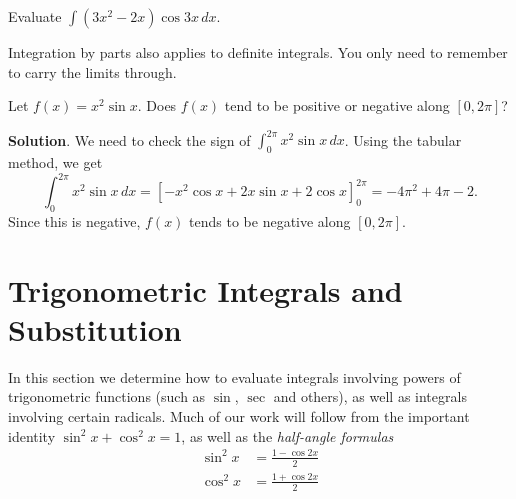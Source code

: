 \documentclass[10pt,]{book}
\theoremstyle{ptxplainnotitle}
\theoremstyle{ptxplaintitle}
\theoremstyle{ptxplainnotitle}
\theoremstyle{ptxplaintitle}
\theoremstyle{ptxplainnotitle}
\theoremstyle{ptxplaintitle}
\theoremstyle{ptxdefinitionnotitle}
\theoremstyle{ptxdefinitiontitle}
\theoremstyle{ptxdefinitionnotitle}
\theoremstyle{ptxdefinitiontitle}
\theoremstyle{ptxdefinitionnotitle}
\theoremstyle{ptxdefinitiontitle}
\theoremstyle{ptxdefinitionnotitle}
\theoremstyle{ptxdefinitiontitle}
\theoremstyle{ptxdefinitionnotitle}
\theoremstyle{ptxdefinitiontitle}
\numberwithin{equation}{section}
\begin{document}
\begin{example}\label{example-the-tabular-method}
\hypertarget{p-515}{}%
Evaluate \(\int (3x^{2} - 2x)\cos3x\,dx\).%
\end{example}
\hypertarget{p-516}{}%
Integration by parts also applies to definite integrals. You only need to remember to carry the limits through.%
\begin{example}\label{example-sign-of-a-sine}
\hypertarget{p-517}{}%
Let \(f(x) = x^{2}\sin x\). Does \(f(x)\) tend to be positive or negative along \([0,2\pi]\)?%
\par\smallskip%
\noindent\textbf{Solution}.\hypertarget{solution-113}{}\quad%
\hypertarget{p-518}{}%
We need to check the sign of \(\int_{0}^{2\pi}x^{2}\sin x\,dx\). Using the tabular method, we get%
\begin{equation*}
\int_{0}^{2\pi}x^{2}\sin x\,dx = [-x^{2}\cos x + 2x\sin x + 2\cos x]_{0}^{2\pi} = -4\pi^{2} + 4\pi - 2.
\end{equation*}
Since this is negative, \(f(x)\) tends to be negative along \([0,2\pi]\).%
\end{example}
\typeout{************************************************}
\typeout{************************************************}
\section[{Trigonometric Integrals and Substitution}]{Trigonometric Integrals and Substitution}\label{section-trigonometric-integrals-and-substitution}
\hypertarget{p-519}{}%
In this section we determine how to evaluate integrals involving powers of trigonometric functions (such as \(\sin\), \(\sec\) and others), as well as integrals involving certain radicals. Much of our work will follow from the important identity \(\sin^{2}x + \cos^{2}x = 1\), as well as the \emph{half-angle formulas}%
\begin{align*}
\sin^{2}x & = \frac{1 - \cos2x}{2} \\
\cos^{2}x & = \frac{1 + \cos2x}{2} 
\end{align*}
%
\typeout{************************************************}
\typeout{************************************************}
\end{document}
